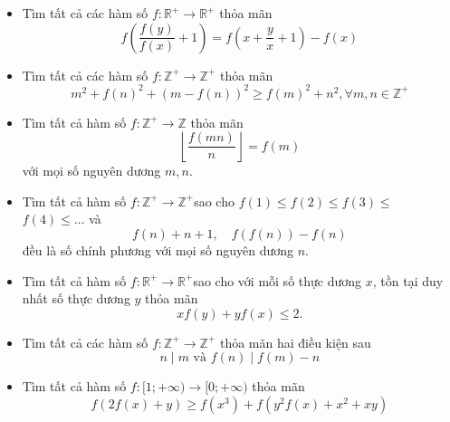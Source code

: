 \documentclass[11pt]{scrartcl}
\begin{document}
\begin{itemize}[label=, leftmargin=0em, itemsep=-0em]
    \item \begin{btvn}
        Tìm tất cả các hàm số $f: \mathbb{R}^+\rightarrow \mathbb{R}^+$ thỏa mãn
        \[f\left(\frac{f(y)}{f(x)}+1\right)=f\left(x+\frac{y}{x}+1\right)-f(x)\]
    \end{btvn}

    \item \begin{btvn}
        Tìm tất cả các hàm số $f: \mathbb{Z}^+\rightarrow \mathbb{Z}^+$ thỏa mãn
        \[m^{2}+f(n)^{2}+(m-f(n))^{2}\geq f(m)^{2}+n^{2},\forall m,n \in \mathbb{Z}^+\]
    \end{btvn}
    \item \begin{btvn}
        Tìm tất cả hàm số $f: \mathbb{Z}^{+} \rightarrow \mathbb{Z}$ thỏa mãn
        $$
        \left\lfloor\frac{f(m n)}{n}\right\rfloor=f(m)
        $$
        với mọi số nguyên dương $m, n$.
    \end{btvn}
    \item \begin{btvn}
        Tìm tất cả hàm số $f: \mathbb{Z}^{+} \rightarrow \mathbb{Z}^{+}$sao cho $f(1) \leq f(2) \leq f(3) \leq$ $f(4) \leq \ldots$ và
        $$
        f(n)+n+1, \quad f(f(n))-f(n)
        $$
        đều là số chính phương với mọi số nguyên dương $n$.
    \end{btvn}
    \item \begin{btvn}
         Tìm tất cả hàm số $f: \mathbb{R}^{+} \rightarrow \mathbb{R}^{+}$sao cho với mỗi số thực dương $x$, tồn tại duy nhất số thực dương $y$ thỏa mãn
            $$
            x f(y)+y f(x) \leq 2 .
            $$
    \end{btvn}
    \item \begin{btvn}
        Tìm tất cả các hàm số $f: \mathbb{Z}^+\rightarrow \mathbb{Z}^+$ thỏa mãn hai điều kiện sau
        \[
            n \mid m \text{ và }f(n) \mid f(m) - n
        \]
    \end{btvn}
    \item \begin{btvn}
         Tìm tất cả hàm số $f:[1 ;+\infty) \rightarrow[0 ;+\infty)$ thỏa mãn
        $$
        f(2 f(x)+y) \geq f\left(x^3\right)+f\left(y^2 f(x)+x^2+x y\right)
        $$

\end{btvn}
\end{itemize}
\end{document}
